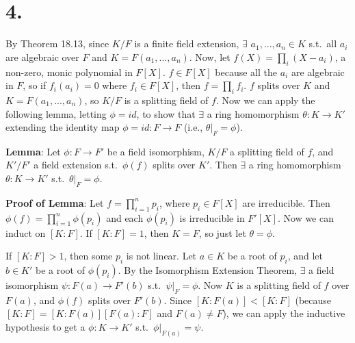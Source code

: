 \documentclass[fleqn]{article}
\begin{document}
    \section{4.}
    
    By Theorem 18.13, since $K/F$ is a finite field extension, $\exists$ $a_1, ..., a_n \in K$ s.t.\ all $a_i$ are algebraic over $F$ and $K = F(a_1, ..., a_n)$.  Now, let $f(X) = \prod\limits_i (X - a_i)$, a non-zero, monic polynomial in $F[X]$.  $f \in F[X]$ because all the $a_i$ are algebraic in $F$, so if $f_i(a_i) = 0$ where $f_i \in F[X]$, then $f = \prod\limits_i f_i$.  $f$ splits over $K$ and $K = F(a_1, ..., a_n)$, so $K/F$ is a splitting field of $f$.  Now we can apply the following lemma, letting $\phi = id$, to show that $\exists$ a ring homomorphism $\theta: K \to K'$ extending the identity map $\phi = id: F \to F$ (i.e., $\theta \rvert_F = \phi$).
    
    \textbf{Lemma}: Let $\phi: F \to F'$ be a field isomorphism, $K/F$ a splitting field of $f$, and $K'/F'$ a field extension s.t.\ $\phi(f)$ splits over $K'$.  Then $\exists$ a ring homomorphism $\theta: K \to K'$ s.t.\ $\theta \rvert_F = \phi$.
    
    \textbf{Proof of Lemma}: Let $f = \prod\limits_{i = 1}^n p_i$, where $p_i \in F[X]$ are irreducible.  Then $\phi(f) = \prod\limits_{i = 1}^n \phi(p_i)$ and each $\phi(p_i)$ is irreducible in $F'[X]$.  Now we can induct on $[K : F]$.  If $[K : F] = 1$, then $K = F$, so just let $\theta = \phi$.
    
    If $[K : F] > 1$, then some $p_i$ is not linear.  Let $a \in K$ be a root of $p_i$, and let $b \in K'$ be a root of $\phi(p_i)$.  By the Isomorphism Extension Theorem, $\exists$ a field isomorphism $\psi: F(a) \to F'(b)$ s.t.\ $\psi \rvert_F = \phi$.  Now $K$ is a splitting field of $f$ over $F(a)$, and $\phi(f)$ splits over $F'(b)$.  Since $[K : F(a)] < [K : F]$ (because $[K : F] = [K : F(a)] [F(a) : F]$ and $F(a) \neq F$), we can apply the inductive hypothesis to get a $\phi: K \to K'$ s.t.\ $\phi \rvert_{F(a)} = \psi$.
    
\end{document}
